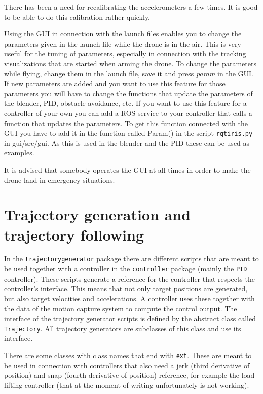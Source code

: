 \documentclass[titlepage,11pt,a4paper]{article}
\begin{document}
There has been a need for recalibrating the accelerometers a few
times. It is good to be able to do this calibration rather quickly.

Using the GUI in connection with the launch files enables you to
change the parameters given in the launch file while the drone is in
the air. This is very useful for the tuning of parameters, especially
in connection with the tracking visualizations that are started when
arming the drone. To change the parameters while flying, change them
in the launch file, save it and press \textit{param} in the GUI. If new
parameters are added and you want to use this feature for those
parameters you will have to change the functions that update the
parameters of the blender, PID, obstacle avoidance, etc. If you want
to use this feature for a controller of your own you can add a ROS
service to your controller that calls a function that updates the
parameters. To get this function connected with the GUI you have to
add it in the function called Param() in the script
\texttt{rqt\textunderscore iris.py} in gui/src/gui. As this is used in
the blender and the PID these can be used as examples.

It is advised that somebody operates the GUI at all times in order to
make the drone land in emergency situations.


\section{Trajectory generation and trajectory following}
\label{sec:trajectory}

In the \texttt{trajectory\textunderscore generator} package there are
different scripts that are meant to be used together with a controller
in the \texttt{controller} package (mainly the \texttt{PID}
controller). These scripts generate a reference for the controller
that respects the controller's interface. This means that not only
target positions are generated, but also target velocities and
accelerations. A controller uses these together with the data of the
motion capture system to compute the control output. The interface of
the trajectory generator scripts is defined by the abstract class
called \texttt{Trajectory}. All trajectory generators are subclasses
of this class and use its interface.

There are some classes with class names that end with
\texttt{\textunderscore ext}. These are meant to be used in connection
with controllers that also need a jerk (third derivative of position)
and snap (fourth derivative of position) reference, for example the load
lifting controller (that at the moment of writing unfortunately is not
working).
\end{document}
